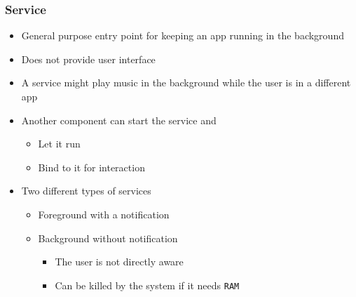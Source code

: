 %
%

\begin{frame}
  \frametitle{Service}
  
  \begin{itemize}
  \item<1-> General purpose entry point for keeping an app running in
    the background
  
  \item<2->[] Does not provide user interface

  \item<3-> A service might play music in the background while the
    user is in a different app

  \item<4-> Another component can start the service and 

    \begin{itemize}
    \item<4-> Let it run
    \item<4-> Bind to it for interaction
    \end{itemize}

  \item<5-> Two different types of services

    \begin{itemize}
    \item<6-> Foreground with a notification
    \item<7-> Background without notification
      \begin{itemize}
      \item<7-> The user is not directly aware
      \item<7-> Can be killed by the system if it needs \texttt{RAM}
      \end{itemize}
    \end{itemize}

  \end{itemize}

\end{frame}


